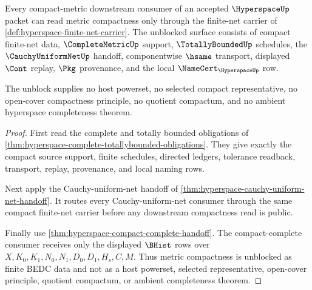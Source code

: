 \begin{theorem}
\label{thm:hyperspace-metric-compactness-unblock}
Every compact-metric downstream consumer of an accepted $\HyperspaceUp$ packet can read metric compactness only through the finite-net carrier of \autoref{def:hyperspace-finite-net-carrier}. The unblocked surface consists of compact finite-net data, $\CompleteMetricUp$ support, $\TotallyBoundedUp$ schedules, the $\CauchyUniformNetUp$ handoff, componentwise $\hsame$ transport, displayed $\Cont$ replay, $\Pkg$ provenance, and the local $\NameCert_{\HyperspaceUp}$ row.

The unblock supplies no host powerset, no selected compact representative, no open-cover compactness principle, no quotient compactum, and no ambient hyperspace completeness theorem.
\end{theorem}
\begin{proof}
First read the complete and totally bounded obligations of \autoref{thm:hyperspace-complete-totallybounded-obligations}. They give exactly the compact source support, finite schedules, directed ledgers, tolerance readback, transport, replay, provenance, and local naming rows.

Next apply the Cauchy-uniform-net handoff of \autoref{thm:hyperspace-cauchy-uniform-net-handoff}. It routes every Cauchy-uniform-net consumer through the same compact finite-net carrier before any downstream compactness read is public.

Finally use \autoref{thm:hyperspace-compact-complete-handoff}. The compact-complete consumer receives only the displayed $\BHist$ rows over $X,K_0,K_1,N_0,N_1,D_0,D_1,H_s,C,M$. Thus metric compactness is unblocked as finite BEDC data and not as a host powerset, selected representative, open-cover principle, quotient compactum, or ambient completeness theorem.
\end{proof}

